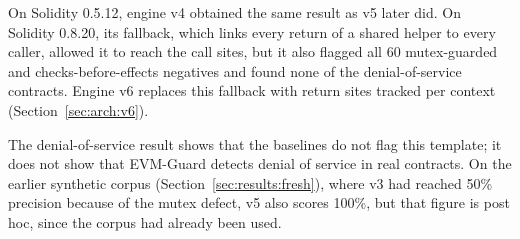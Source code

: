 \documentclass[pdflatex,sn-mathphys]{sn-jnl}
\theoremstyle{thmstyletwo}
\theoremstyle{thmstyletwo}
\begin{document}
\begin{table}[t]
\centering
\small
\caption{Protocol~5: intermediate engine v4 (return-site fallback) on two pre-registered synthetic corpora of 210 contracts (30 reentrancy, 30 denial of service, 150 negatives). Precision with exact 95\% Clopper--Pearson intervals; recall is 100\% wherever TP is 30. Engine v4 was not adopted.}
\label{tab:protocol5}
\end{table}

On Solidity 0.5.12, engine v4 obtained the same result as v5 later did. On Solidity 0.8.20, its fallback, which links every return of a shared helper to every caller, allowed it to reach the call sites, but it also flagged all 60 mutex-guarded and checks-before-effects negatives and found none of the denial-of-service contracts. Engine v6 replaces this fallback with return sites tracked per context (Section~\ref{sec:arch:v6}).

The denial-of-service result shows that the baselines do not flag this template; it does not show that EVM-Guard detects denial of service in real contracts. On the earlier synthetic corpus (Section~\ref{sec:results:fresh}), where v3 had reached 50\% precision because of the mutex defect, v5 also scores 100\%, but that figure is post hoc, since the corpus had already been used.
\end{document}
